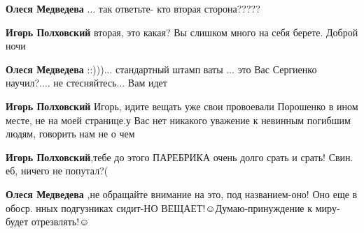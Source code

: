 \begin{itemize}
\begin{itemize}
\textbf{Олеся Медведева} ... так ответьте- кто вторая сторона?????

 
\textbf{Игорь Полховский} вторая, это какая? Вы слишком много на себя берете. Доброй ночи

 
\textbf{Олеся Медведева} ::)))... стандартный штамп ваты ... это Вас Сергиенко научил?.... не стесняйтесь... Вам идет

 
\textbf{Игорь Полховский} Игорь, идите вещать уже свои провоевали Порошенко в
ином месте, не на моей странице.у Вас нет никакого уважение к невинным погибшим
людям, говорить нам не о чем

 
\textbf{Игорь Полховский},тебе до этого ПАРЕБРИКА очень долго срать и срать! Свин. еб, ничего не попутал?(

 
\textbf{Олеся Медведева} ,не обращайте внимание на это, под названием-оно! Оно еще в обоср. нных подгузниках сидит-НО ВЕЩАЕТ!☺Думаю-принуждение к миру-будет отрезвлять!☺

 

\end{itemize}
\end{itemize}
